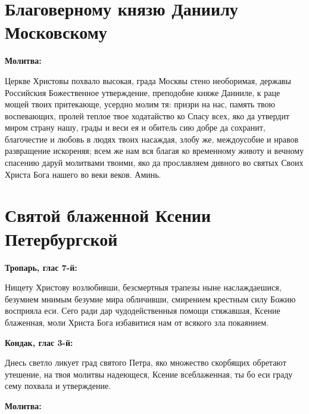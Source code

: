 \section{Благоверному князю Даниилу Московскому}
 
\bfseries Молитва:\normalfont{}


Церкве Христовы похвало высокая, града Москвы стено необоримая, державы Российския Божественное утверждение, преподобне княже Данииле, к раце мощей твоих притекающе, усердно молим тя: призри на нас, память твою воспевающих, пролей теплое твое ходатайство ко Спасу всех, яко да утвердит миром страну нашу, грады и веси ея и обитель сию добре да сохранит, благочестие и любовь в людях твоих насаждая, злобу же, междоусобие и нравов развращение искореняя; всем же нам вся благая ко временному животу и вечному спасению даруй молитвами твоими, яко да прославляем дивного во святых Своих Христа Бога нашего во веки веков. Аминь.


 

\section{Святой блаженной Ксении Петербургской}
 
\bfseries Тропарь, глас 7-й:\normalfont{}


Нищету Христову возлюбивши, безсмертныя трапезы ныне наслаждаешися, безумием мнимым безумие мира обличивши, смирением крестным силу Божию восприяла еси. Сего ради дар чудодейственныя помощи стяжавшая, Ксение блаженная, моли Христа Бога избавитися нам от всякого зла покаянием.


\medskip
\bfseries Кондак, глас 3-й:\normalfont{}


Днесь светло ликует град святого Петра, яко множество скорбящих обретают утешение, на твоя молитвы надеющеся, Ксение всеблаженная, ты бо еси граду сему похвала и утверждение.


\medskip
\bfseries Молитва:\normalfont{}


